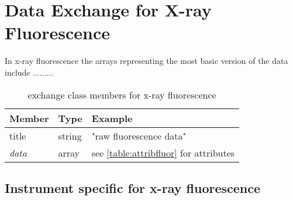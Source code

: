 \section{Data Exchange for X-ray Fluorescence}
\label{exchange:fluorescence}

In x-ray fluorescence the arrays representing the most basic version of the data include .........

\begin{table}[h!]\sffamily \footnotesize
\caption{exchange class members for x-ray fluorescence}

\begin{tabular}{p{2.0cm} p{3.0cm}  p{6.5cm} }
\toprule
\bfseries Member     & \bfseries Type & \bfseries Example \\
\midrule
title  & string & "raw fluorescence data" \\
\emph{data}  &  array & see \ref{table:attribfluor} for attributes \\
\bottomrule
\end{tabular}
\end{table}



\subsection{Instrument specific for x-ray fluorescence}
\label{instrument:fluo}